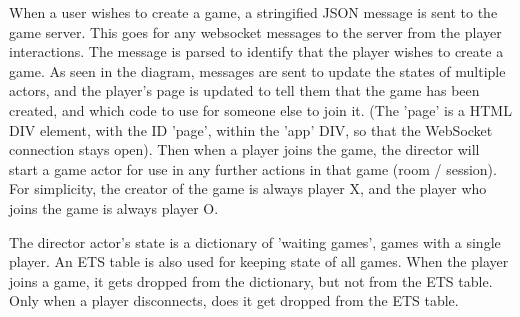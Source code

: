 \documentclass[]{final}
\begin{document}
When a user wishes to create a game, a stringified JSON message is sent to the game server.
This goes for any websocket messages to the server from the player interactions.
The message is parsed to identify that the player wishes to create a game. As seen in the diagram,
messages are sent to update the states of multiple actors, and the player's page is updated to tell
them that the game has been created, and which code to use for someone else to join it.
(The 'page' is a HTML DIV element, with the ID 'page', within the 'app' DIV, so that the WebSocket
connection stays open). Then when a player joins the game, the director will start
a game actor for use in any further actions in that game (room / session). For simplicity,
the creator of the game is always player X, and the player who joins the game is always player O.
\begin{minipage}[t]{18em}

  The director actor's state is a dictionary of 'waiting games',
  games with a single player. An ETS table is also used for keeping
  state of all games. When the player joins a game, it gets dropped
  from the dictionary, but not from the ETS table. Only when a player
  disconnects, does it get dropped from the ETS table.

\end{minipage}
\hfill
\end{document}
